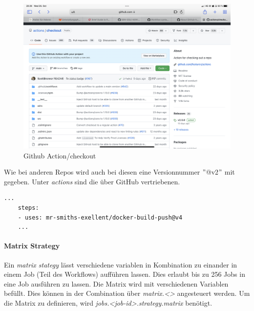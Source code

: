 \begin{figure}[H]
	\centering
	\includegraphics[scale = 0.2]{attachment/chapter_2/Scc102}
	\caption{Github Action/checkout}
\end{figure}

Wie bei anderen Repos wird auch bei diesen eine Versionnummer $"$@v2$"$ mit gegeben. Unter \textit{actions} sind die über GitHub vertriebenen.

\begin{lstlisting}[style=Config, caption={Extern Action}, captionpos=b]
	...
	steps:
	- uses: mr-smiths-exellent/docker-build-push@v4
	...
\end{lstlisting}

\paragraph{Matrix Strategy}
Ein \textit{matrix stategy} lässt verschiedene variablen in Kombination zu einander in einem Job (Teil des Workflows) aufführen lassen. Dies erlaubt bis zu 256 Jobs in eine Job ausführen zu lassen. Die Matrix wird mit verschiedenen Variablen befüllt. Dies können in der Combination über \textit{matrix.<>} angesteuert werden. Um die Matrix zu definieren, wird \textit{jobs.<job-id>.strategy.matrix} benötigt.

